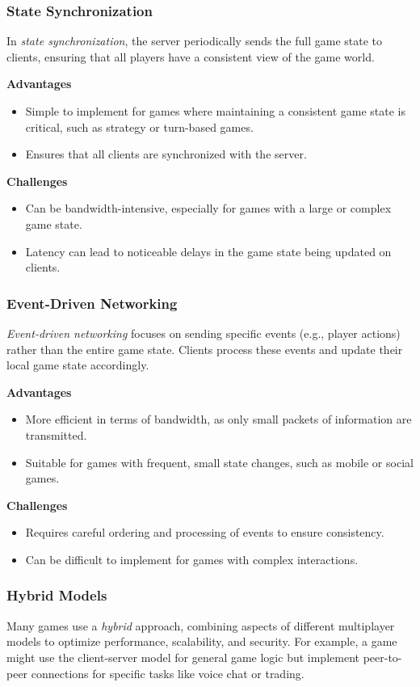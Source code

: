 \documentclass{article} %
\begin{document}
\subsubsection{State Synchronization}
In \textit{state synchronization}, the server periodically sends the full game state to clients, ensuring that all players have a consistent view of the game world.

\textbf{Advantages}
\begin{itemize}
	\item Simple to implement for games where maintaining a consistent game state is critical, such as strategy or turn-based games.
	\item Ensures that all clients are synchronized with the server.
\end{itemize}

\textbf{Challenges}
\begin{itemize}
	\item Can be bandwidth-intensive, especially for games with a large or complex game state.
	\item Latency can lead to noticeable delays in the game state being updated on clients.
\end{itemize}

\subsubsection{Event-Driven Networking}
\textit{Event-driven networking} focuses on sending specific events (e.g., player actions) rather than the entire game state. Clients process these events and update their local game state accordingly.

\textbf{Advantages}
\begin{itemize}
	\item More efficient in terms of bandwidth, as only small packets of information are transmitted.
	\item Suitable for games with frequent, small state changes, such as mobile or social games.
\end{itemize}

\textbf{Challenges}
\begin{itemize}
	\item Requires careful ordering and processing of events to ensure consistency.
	\item Can be difficult to implement for games with complex interactions.
\end{itemize}

\subsubsection{Hybrid Models}
Many games use a \textit{hybrid} approach, combining aspects of different multiplayer models to optimize performance, scalability, and security. For example, a game might use the client-server model for general game logic but implement peer-to-peer connections for specific tasks like voice chat or trading.
\end{document}
